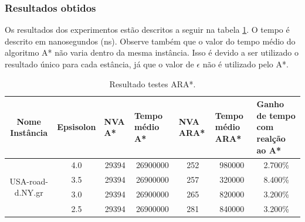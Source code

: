 \subsubsection{Resultados obtidos}
\label{sec-experimentos-dinamicos-ara-resultados}

Os resultados dos experimentos estão descritos a seguir na tabela \ref{tbl-experimentos-dinamicos-ara}. O tempo é descrito em nanosegundos (ns). Observe também que o valor do tempo médio do algoritmo A* não varia dentro da mesma instância. Isso é devido a ser utilizado o resultado único para cada estância, já que o valor de $\epsilon$ não é utilizado pelo A*.

\begin{table}[H]
\caption{Resultado testes ARA*.}
\label{tbl-experimentos-dinamicos-ara}
\centering
\begin{adjustbox}{max width=\textwidth}
\begin{tabular}{|c|c|c|c|c|c|c|}
\hline
\textbf{Nome Instância}            & \multicolumn{1}{l|}{\textbf{Epsisolon}} & \multicolumn{1}{l|}{\textbf{NVA A*}} & \multicolumn{1}{l|}{\textbf{Tempo médio A*}} & \multicolumn{1}{l|}{\textbf{NVA ARA*}} & \multicolumn{1}{l|}{\textbf{Tempo médio ARA*}} & \multicolumn{1}{l|}{\textbf{Ganho de tempo com realção ao A*}} \\ \hline
\multirow{7}{*}{USA-road-d.NY.gr}  & 4.0                                     & 29394                                & 26900000                                     & 252                                    & 980000                                         & 2.700\%                                                        \\ \cline{2-7} 
                                   & 3.5                                     & 29394                                & 26900000                                     & 257                                    & 320000                                         & 8.400\%                                                        \\ \cline{2-7} 
                                   & 3.0                                     & 29394                                & 26900000                                     & 265                                    & 820000                                         & 3.200\%                                                        \\ \cline{2-7} 
                                   & 2.5                                     & 29394                                & 26900000                                     & 281                                    & 840000                                         & 3.200\%                                                        \\ \cline{2-7} 

\end{tabular}
\end{adjustbox}
\end{table}
